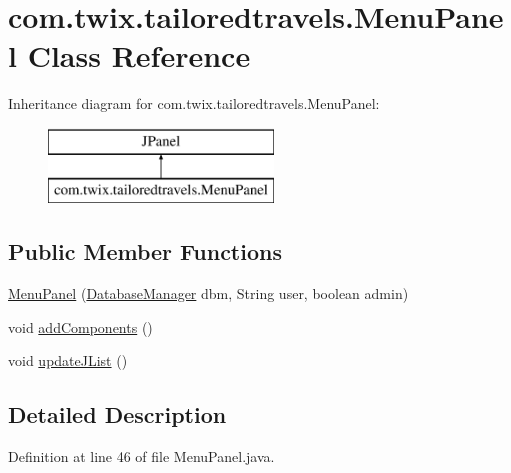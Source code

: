 \hypertarget{classcom_1_1twix_1_1tailoredtravels_1_1_menu_panel}{\section{com.\-twix.\-tailoredtravels.\-Menu\-Panel Class Reference}
\label{classcom_1_1twix_1_1tailoredtravels_1_1_menu_panel}
}
Inheritance diagram for com.\-twix.\-tailoredtravels.\-Menu\-Panel\-:\begin{figure}[H]
\begin{center}
\leavevmode
\includegraphics[height=2.000000cm]{classcom_1_1twix_1_1tailoredtravels_1_1_menu_panel}
\end{center}
\end{figure}
\subsection*{Public Member Functions}
\begin{DoxyCompactItemize}
\item 
\hyperlink{classcom_1_1twix_1_1tailoredtravels_1_1_menu_panel_aa85bfae72b9b9077e404b43b71789250}{Menu\-Panel} (\hyperlink{classcom_1_1twix_1_1tailoredtravels_1_1_database_manager}{Database\-Manager} dbm, String user, boolean admin)
\item 
void \hyperlink{classcom_1_1twix_1_1tailoredtravels_1_1_menu_panel_aaa1aefac37f56d3bfef741bd25634803}{add\-Components} ()
\item 
void \hyperlink{classcom_1_1twix_1_1tailoredtravels_1_1_menu_panel_a3f44b3bda0c13cd20e55712f05a9a37b}{update\-J\-List} ()
\end{DoxyCompactItemize}


\subsection{Detailed Description}


Definition at line 46 of file Menu\-Panel.\-java.



